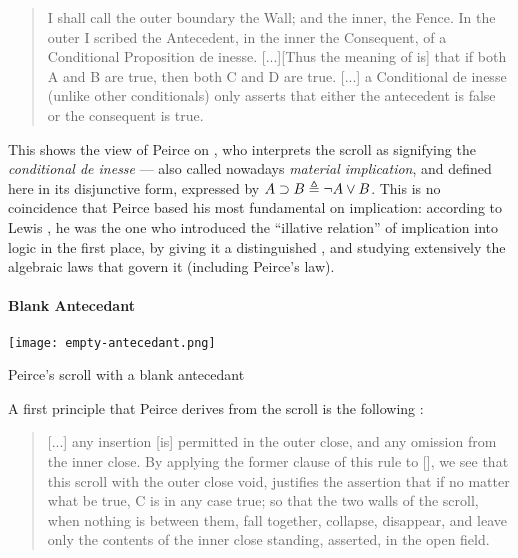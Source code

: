 \begin{scope}
\begin{quote}
  I shall call the outer boundary the Wall; and the inner, the Fence. In the
outer I scribed the Antecedent, in the inner the Consequent, of a Conditional
Proposition de inesse. [...][Thus the meaning of  is] that if
both A and B are true, then both C and D are true. [...] a Conditional de inesse
(unlike other conditionals) only asserts that either the antecedent is false or
the consequent is true. 
\end{quote}

This shows the  view of Peirce on , who interprets the scroll as
signifying the \textit{conditional de inesse} --- also called nowadays
\emph{material implication}, and defined here in its disjunctive form, expressed
 by $A \supset B \triangleq \neg A \lor B$. This is no coincidence that
Peirce based his most fundamental  on implication: according to Lewis
, he was the one who introduced the
``illative relation'' of implication into  logic in the first place, by
giving it a distinguished , and studying extensively the algebraic laws
that govern it (including Peirce's law).

\paragraph{Blank Antecedant}

\begin{marginfigure}
  \texttt{[image: empty-antecedant.png]}
  \caption{Peirce's scroll with a blank antecedant}
\end{marginfigure}

A first principle that Peirce derives from the scroll is the following
\cite[p.~534]{peirce_prolegomena_1906}:

\begin{quote}
  [...] any insertion [is] permitted in the outer close, and any omission from
the inner close. By applying the former clause of this rule to
[], we see that this scroll with the outer close void,
justifies the assertion that if no matter what be true, C is in any case true;
so that the two walls of the scroll, when nothing is between them, fall
together, collapse, disappear, and leave only the contents of the inner close
standing, asserted, in the open field.
\end{quote}


\end{scope}
